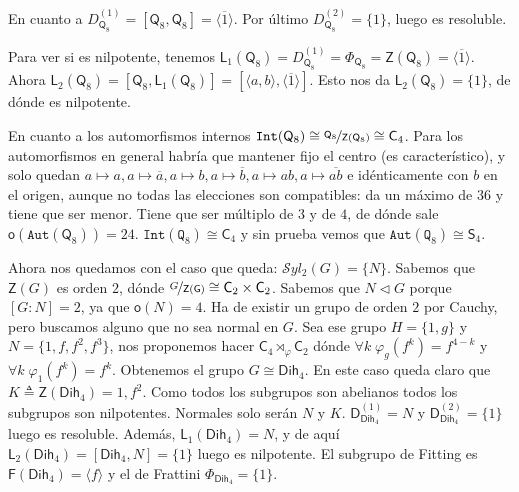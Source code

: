 \documentclass[12pt,a4paper,fleqn,spanish,final,openright]{extbook}
\theoremstyle{definition}
\theoremstyle{remark}
\begin{document}
    En cuanto a $D_{\mathsf{Q}_8}^{(1)}=\left[{\mathsf{Q}_8,\mathsf{Q}_8}\right]=\langle \overline{1}\rangle$. Por último $D_{\mathsf{Q}_8}^{(2)}=\{1\}$, luego es resoluble.
    
    Para ver si es nilpotente, tenemos $\mathsf{L}_{1}(\mathsf{Q}_8)=D_{\mathsf{Q}_8}^{(1)}=\Phi_{\mathsf{Q}_8}=\mathsf{Z}(\mathsf{Q}_8)=\langle{\overline{1}}\rangle$. Ahora $\mathsf{L}_{2}(\mathsf{Q}_8)=\left[\mathsf{Q}_8,\mathsf{L}_1(\mathsf{Q}_8)\right]=\left[\langle{a,b}\rangle,\langle{\overline{1}}\rangle\right]$. Esto nos da $\mathsf{L}_{2}(\mathsf{Q}_8)=\{1\}$, de dónde es nilpotente.
    
    En cuanto a los automorfismos internos $\mathtt{Int}(\mathsf{Q}_8)\cong \nicefrac{\mathsf{Q}_8}{\mathsf{Z}(\mathsf{Q}_8)}\cong\mathsf{C}_4$. Para los automorfismos en general habría que mantener fijo el centro (es característico), y solo quedan $a\mapsto a,a\mapsto\overline{a},a\mapsto b,a\mapsto\overline{b},a\mapsto {ab},a\mapsto\overline{ab}$ e idénticamente con $b$ en el origen, aunque no todas las elecciones son compatibles: da un máximo de $36$ y tiene que ser menor. Tiene que ser múltiplo de $3$ y de $4$, de dónde sale $\mathsf{o}\left(\mathtt{Aut}(\mathsf{Q}_8)\right)=24$. $\mathtt{Int}(\mathtt{Q}_8)\cong\mathsf{C}_4$ y sin prueba vemos que $\mathtt{Aut}(\mathtt{Q}_8)\cong\mathsf{S}_4$.
    
    Ahora nos quedamos con el caso que queda: $\mathcal{S}yl_2 (G)=\{N\}$. Sabemos que $\mathsf{Z}(G)$ es orden $2$, dónde $\nicefrac{G}{\mathsf{Z}(\mathsf{G})}\cong {{\mathsf{C}}_{2}}\times{{\mathsf{C}}_{2}}$. Sabemos que $N\lhd G$ porque $[G:N]=2$, ya que $\mathsf{o}(N)=4$. Ha de existir un grupo de orden $2$ por Cauchy, pero buscamos alguno que no sea normal en $G$. Sea ese grupo $H=\{1,g\}$ y $N=\{1,f,f^2,f^3\}$, nos proponemos hacer $\mathsf{C}_{4}\rtimes_{\varphi}\mathsf{C}_{2}$ dónde $\forall k \;\varphi_g (f^k)=f^{4-k}$ y $\forall k\;\varphi_1 (f^k)=f^k$. Obtenemos el grupo $G\cong\mathsf{Dih}_{4}$. En este caso queda claro que $K \triangleq\mathsf{Z}\left(\mathsf{Dih}_4\right)={1,f^2}$. Como todos los subgrupos son abelianos todos los subgrupos son nilpotentes. Normales solo serán $N$ y $K$. ${\mathsf{D}}_{\mathsf{Dih}_4}^{(1)} = N$ y ${\mathsf{D}}_{\mathsf{Dih}_4}^{(2)} = \{1\}$ luego es resoluble. Además, $\mathsf{L}_{1}(\mathsf{Dih}_4)=N$, y de aquí $\mathsf{L}_{2}(\mathsf{Dih}_4)=\left[\mathsf{Dih}_4,N\right]=\{1\}$ luego es nilpotente. El subgrupo de Fitting es $\mathsf{F}(\mathsf{Dih}_4)=\langle f\rangle$ y el de Frattini $\Phi_{\mathsf{Dih}_4} = \{1\}$.
    
\end{document}
